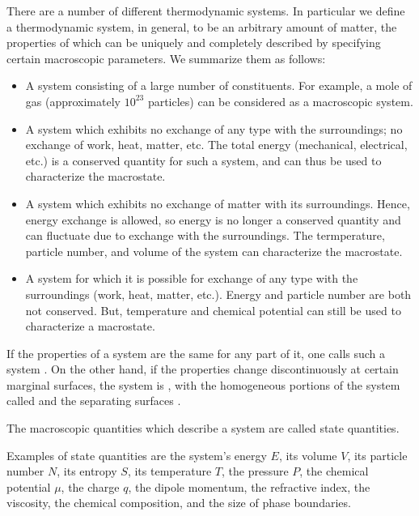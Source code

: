 \documentclass[12pt, a4paper, oneside, openright, titlepage]{book}
\begin{document}
\begin{defn}[Systems]
    There are a number of different thermodynamic systems. In particular we define a thermodynamic system, in general, to be an arbitrary amount of matter, the properties of which can be uniquely and completely described by specifying certain macroscopic parameters. We summarize them as follows: \begin{itemize}
        \item {} A system consisting of a large number of constituents. For example, a mole of gas (approximately $10^{23}$ particles) can be considered as a macroscopic system.
        \item {} A system which exhibits no exchange of any type with the surroundings; no exchange of work, heat, matter, etc. The total energy (mechanical, electrical, etc.) is a conserved quantity for such a system, and can thus be used to characterize the macrostate.
        \item {} A system which exhibits no exchange of matter with its surroundings. Hence, energy exchange is allowed, so energy is no longer a conserved quantity and can fluctuate due to exchange with the surroundings. The termperature, particle number, and volume of the system can characterize the macrostate.
        \item {} A system for which it is possible for exchange of any type with the surroundings (work, heat, matter, etc.). Energy and particle number are both not conserved. But, temperature and chemical potential can still be used to characterize a macrostate.
    \end{itemize}
\end{defn}

If the properties of a system are the same for any part of it, one calls such a system . On the other hand, if the properties change discontinuously at certain marginal surfaces, the system is , with the homogeneous portions of the system called  and the separating surfaces . 

\begin{defn}
    The macroscopic quantities which describe a system are called state quantities.
\end{defn}

\begin{eg}
    Examples of state quantities are the system's energy $E$, its volume $V$, its particle number $N$, its entropy $S$, its temperature $T$, the pressure $P$, the chemical potential $\mu$, the charge $q$, the dipole momentum, the refractive index, the viscosity, the chemical composition, and the size of phase boundaries.
\end{eg}
\end{document}
